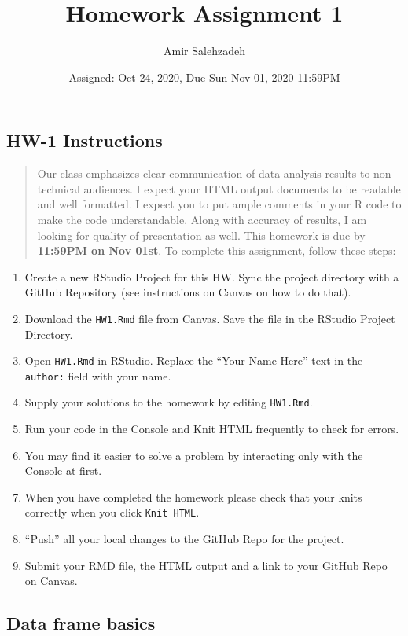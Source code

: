 \documentclass[
]{article}
\title{Homework Assignment 1}
\author{Amir Salehzadeh}
\date{Assigned: Oct 24, 2020, Due Sun Nov 01, 2020 11:59PM}
\begin{document}
\maketitle

\hypertarget{hw-1-instructions}{%
\subsection{HW-1 Instructions}\label{hw-1-instructions}}

\begin{quote}
Our class emphasizes clear communication of data analysis results to
non-technical audiences. I expect your HTML output documents to be
readable and well formatted. I expect you to put ample comments in your
R code to make the code understandable. Along with accuracy of results,
I am looking for quality of presentation as well. This homework is due
by \textbf{11:59PM on Nov 01st}. To complete this assignment, follow
these steps:
\end{quote}

\begin{enumerate}
\def\labelenumi{\arabic{enumi}.}
\item
  Create a new RStudio Project for this HW. Sync the project directory
  with a GitHub Repository (see instructions on Canvas on how to do
  that).
\item
  Download the \texttt{HW1.Rmd} file from Canvas. Save the file in the
  RStudio Project Directory.
\item
  Open \texttt{HW1.Rmd} in RStudio. Replace the ``Your Name Here'' text
  in the \texttt{author:} field with your name.
\item
  Supply your solutions to the homework by editing \texttt{HW1.Rmd}.
\item
  Run your code in the Console and Knit HTML frequently to check for
  errors.
\item
  You may find it easier to solve a problem by interacting only with the
  Console at first.
\item
  When you have completed the homework please check that your knits
  correctly when you click \texttt{Knit\ HTML}.
\item
  ``Push'' all your local changes to the GitHub Repo for the project.
\item
  Submit your RMD file, the HTML output and a link to your GitHub Repo
  on Canvas.
\end{enumerate}

\hypertarget{data-frame-basics}{%
\subsection{Data frame basics}\label{data-frame-basics}}
\end{document}
